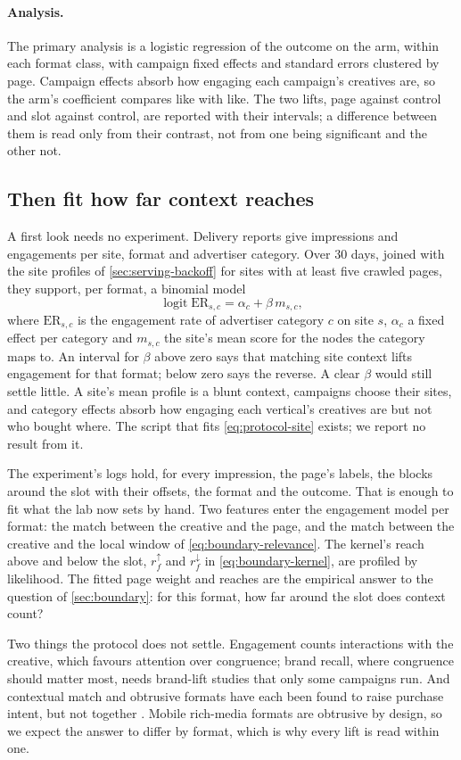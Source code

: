 \paragraph{Analysis.} The primary analysis is a logistic regression of the outcome on the arm, within each format class, with campaign fixed effects and standard errors clustered by page. Campaign effects absorb how engaging each campaign's creatives are, so the arm's coefficient compares like with like. The two lifts, page against control and slot against control, are reported with their intervals; a difference between them is read only from their contrast, not from one being significant and the other not.

\subsection{Then fit how far context reaches}\label{sec:protocol-fit}

A first look needs no experiment. Delivery reports give impressions and engagements per site, format and advertiser category. Over 30 days, joined with the site profiles of \cref{sec:serving-backoff} for sites with at least five crawled pages, they support, per format, a binomial model
\begin{equation}\label{eq:protocol-site}
  \operatorname{logit} \mathrm{ER}_{s,c} = \alpha_c + \beta\, m_{s,c},
\end{equation}
where $\mathrm{ER}_{s,c}$ is the engagement rate of advertiser category $c$ on site $s$, $\alpha_c$ a fixed effect per category and $m_{s,c}$ the site's mean score for the \iab{} nodes the category maps to. An interval for $\beta$ above zero says that matching site context lifts engagement for that format; below zero says the reverse. A clear $\beta$ would still settle little. A site's mean profile is a blunt context, campaigns choose their sites, and category effects absorb how engaging each vertical's creatives are but not who bought where. The script that fits \cref{eq:protocol-site} exists; we report no result from it.

The experiment's logs hold, for every impression, the page's labels, the blocks around the slot with their offsets, the format and the outcome. That is enough to fit what the lab now sets by hand. Two features enter the engagement model per format: the match between the creative and the page, and the match between the creative and the local window of \cref{eq:boundary-relevance}. The kernel's reach above and below the slot, $r^{\uparrow}_f$ and $r^{\downarrow}_f$ in \cref{eq:boundary-kernel}, are profiled by likelihood. The fitted page weight and reaches are the empirical answer to the question of \cref{sec:boundary}: for this format, how far around the slot does context count?

Two things the protocol does not settle. Engagement counts interactions with the creative, which favours attention over congruence; brand recall, where congruence should matter most, needs brand-lift studies that only some campaigns run. And contextual match and obtrusive formats have each been found to raise purchase intent, but not together \citep{goldfarb2011online}. Mobile rich-media formats are obtrusive by design, so we expect the answer to differ by format, which is why every lift is read within one.

